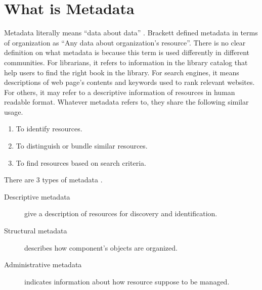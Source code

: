 \section{What is Metadata}
Metadata literally means \enquote{data about data} \cite[p.~1]{baca_2008}.
Brackett \cite[p.149]{brackett_2000} defined metadata in terms of organization as \enquote{Any data about organization's resource}.
There is no clear definition on what metadata is because this term is used differently in different communities.
For librarians, it refers to information in the library catalog that help users to find the right book in the library.
For search engines, it means descriptions of web page's contents and keywords used to rank relevant websites.
For others, it may refer to a descriptive information of resources in human readable format.
Whatever metadata refers to, they share the following similar usage.
\begin{enumerate}
	\item To identify resources.
	\item To distinguish or bundle similar resources.
	\item To find resources based on search criteria.
\end{enumerate}
There are 3 types of metadata \cite{hodge_2001}.
\begin{description}
	\item[Descriptive metadata] give a description of resources for discovery and identification.
	\item[Structural metadata] describes how component's objects are organized.
	\item[Administrative metadata] indicates information about how resource suppose to be managed.
\end{description}

